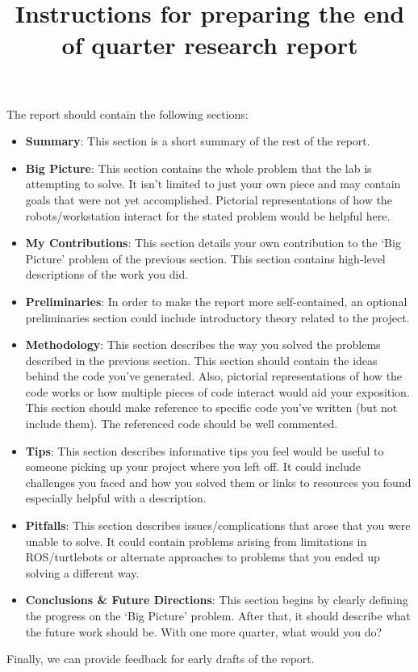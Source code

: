 \documentclass{article}
\begin{document}
\title{Instructions for preparing the end of quarter research report}
\date{}

\maketitle
\vspace{-5ex}


The report should contain the following sections:
\begin{itemize}
\item {\bf Summary}: This section is a short summary of the rest of the report.
\item {\bf Big Picture}: This section contains the whole problem that the lab is
  attempting to solve. It isn't limited to just your own piece and
  may contain goals that were not yet accomplished.  Pictorial
  representations of how the robots/workstation interact for the
  stated problem would be helpful here.
\item {\bf My Contributions}:  This section details your own
  contribution to the `Big Picture' problem of the previous
  section. This section contains high-level descriptions of the work
  you did.
\item {\bf Preliminaries}: In order to make the report more self-contained, an optional preliminaries section could include introductory theory related to the project.
\item {\bf Methodology}: This section describes the way you solved the
  problems described in the previous section.  This section should
  contain the ideas behind the code you've generated.  Also, pictorial
  representations of how the code works or how multiple pieces of code
  interact would aid your exposition.  This section should make
  reference to specific code you've written (but not include them).
  The referenced code should be well commented.
\item {\bf Tips}: This section describes informative tips you feel
  would be useful to someone picking up your project where you left
  off.  It could include challenges you faced and how you solved
  them or links to resources you found especially helpful with a
  description.
\item {\bf Pitfalls}: This section describes issues/complications that arose that
  you were unable to solve.  It could contain problems arising from
  limitations in ROS/turtlebots or alternate approaches to problems
  that you ended up solving a different way.
\item{\bf Conclusions \& Future Directions}: This section begins by clearly
  defining the progress on the `Big Picture' problem.  After that, it
  should describe what the future work should be.  With one more
  quarter, what would you do?
\end{itemize}

Finally, we can provide feedback for early drafts of the report.
\end{document}
